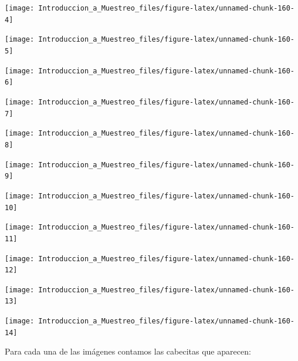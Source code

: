 \documentclass[
]{book}
\begin{document}
\begin{center}\texttt{[image: Introduccion\_a\_Muestreo\_files/figure-latex/unnamed-chunk-160-4]} \end{center}

\begin{center}\texttt{[image: Introduccion\_a\_Muestreo\_files/figure-latex/unnamed-chunk-160-5]} \end{center}

\begin{center}\texttt{[image: Introduccion\_a\_Muestreo\_files/figure-latex/unnamed-chunk-160-6]} \end{center}

\begin{center}\texttt{[image: Introduccion\_a\_Muestreo\_files/figure-latex/unnamed-chunk-160-7]} \end{center}

\begin{center}\texttt{[image: Introduccion\_a\_Muestreo\_files/figure-latex/unnamed-chunk-160-8]} \end{center}

\begin{center}\texttt{[image: Introduccion\_a\_Muestreo\_files/figure-latex/unnamed-chunk-160-9]} \end{center}

\begin{center}\texttt{[image: Introduccion\_a\_Muestreo\_files/figure-latex/unnamed-chunk-160-10]} \end{center}

\begin{center}\texttt{[image: Introduccion\_a\_Muestreo\_files/figure-latex/unnamed-chunk-160-11]} \end{center}

\begin{center}\texttt{[image: Introduccion\_a\_Muestreo\_files/figure-latex/unnamed-chunk-160-12]} \end{center}

\begin{center}\texttt{[image: Introduccion\_a\_Muestreo\_files/figure-latex/unnamed-chunk-160-13]} \end{center}

\begin{center}\texttt{[image: Introduccion\_a\_Muestreo\_files/figure-latex/unnamed-chunk-160-14]} \end{center}

Para cada una de las imágenes contamos las cabecitas que aparecen:
\end{document}
